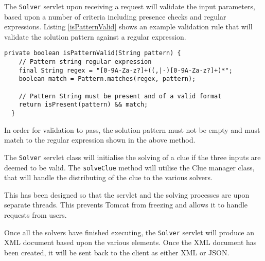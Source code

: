 The \texttt{Solver} servlet upon receiving a request will validate the input 
parameters, based upon a number of criteria including presence checks and 
regular expressions. Listing \ref{isPatternValid} shows an example validation 
rule that will validate the solution pattern against a regular expression.

\begin{lstlisting}[caption={isPatternValid deduces if a given solution pattern 
                            is valid}, label=isPatternValid] 
 private boolean isPatternValid(String pattern) {
    // Pattern string regular expression
    final String regex = "[0-9A-Za-z?]+((,|-)[0-9A-Za-z?]+)*";
    boolean match = Pattern.matches(regex, pattern);

    // Pattern String must be present and of a valid format
    return isPresent(pattern) && match;
  }
\end{lstlisting}

In order for validation to pass, the solution pattern must not be empty and must
match to the regular expression shown in the above method.

The \texttt{Solver} servlet class will initialise the solving of a clue if the 
three inputs are deemed to be valid. The \texttt{solveClue} method will utilise 
the Clue manager class, that will handle the distributing of the clue to the 
various solvers. 

This has been designed so that the servlet and the solving processes are upon 
separate threads. This prevents Tomcat from freezing and allows it to handle 
requests from users.

Once all the solvers have finished executing, the \texttt{Solver} servlet will 
produce an XML document based upon the various elements. Once the XML document 
has been created, it will be sent back to the client as either XML or JSON.
